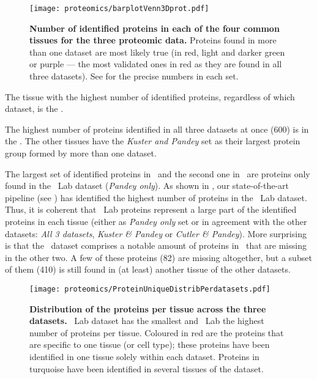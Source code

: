 \begin{figure}[!htbp]
    \texttt{[image: proteomics/barplotVenn3Dprot.pdf]}\centering
    \vspace{-3mm}
    \caption[Identified proteins across the 4 shared tissues for the 3 datasets]%
    {\label{fig:barplot3Dvennprot}\textbf{Number of identified
    proteins in each of the four common tissues for the three proteomic data.}
    Proteins found in more than one dataset are most likely true (in
    red, light and darker green or purple --- the most validated ones in red
    as they are found in all three datasets).
    See  for the precise numbers in each set.}
\end{figure}

The tissue with the highest number of identified proteins,
regardless of which dataset,
is the \ovary.\mybr\

The highest number of proteins identified in all three datasets at once (600)
is in the \heart.
The other tissues have
the \emph{Kuster and Pandey} set as
their largest protein group formed by more than one dataset.\mybr\

The largest set of identified proteins in \pancreas\
and the second one in \ovary\ are proteins only found in the \pandey\ Lab dataset
(\emph{Pandey only}).
As shown in ,
our state-of-the-art pipeline (see ) has identified
the highest number of proteins in the \pandey\  Lab dataset.
Thus, it is coherent that \pandey\ Lab proteins represent a large part of
the identified proteins in each tissue (either as \emph{Pandey only} set or
in agreement with the other datasets:
\emph{All 3 datasets}, \emph{Kuster \& Pandey} or \emph{Cutler \& Pandey}).
More surprising is that the \cutler\ dataset comprises a notable amount of
proteins in \lung\ that are missing in the other two.
A few of these proteins (82) are missing altogether,
but a subset of them (410) is still found
in (at least) another tissue of the other datasets.\mybr\

\begin{figure}[!htpb]
    \texttt{[image: proteomics/ProteinUniqueDistribPerdatasets.pdf]}\centering
    \caption[Distribution of the proteins per tissue]{\label{fig:distribProtUniq3D}%
    \textbf{Distribution of the proteins per tissue across the three datasets.}
    \cutler\ Lab dataset has the smallest and \pandey\ Lab the highest number of proteins
    per tissue.
    Coloured in red are the proteins that are specific to one tissue (or cell type);
    these proteins have been identified in one tissue solely within each dataset.
    Proteins in turquoise have been identified in several tissues of the dataset.}
\end{figure}

